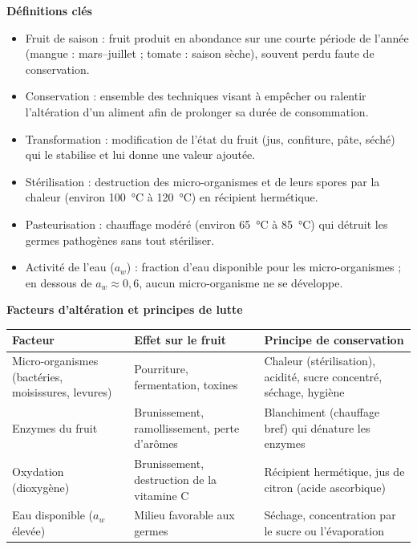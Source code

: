 \documentclass[11pt]{article}
\newcommand{\cle}[1]{{\popxbold\color{popdark}#1}}
\begin{document}
\begin{bilan}
\textbf{Définitions clés}
\begin{itemize}
  \item \cle{Fruit de saison} : fruit produit en abondance sur une courte période de l'année (mangue : mars--juillet ; tomate : saison sèche), souvent perdu faute de conservation.
  \item \cle{Conservation} : ensemble des techniques visant à empêcher ou ralentir l'altération d'un aliment afin de prolonger sa durée de consommation.
  \item \cle{Transformation} : modification de l'état du fruit (jus, confiture, pâte, séché) qui le stabilise et lui donne une valeur ajoutée.
  \item \cle{Stérilisation} : destruction des micro-organismes et de leurs spores par la chaleur (environ \SI{100}{\celsius} à \SI{120}{\celsius}) en récipient hermétique.
  \item \cle{Pasteurisation} : chauffage modéré (environ \SI{65}{\celsius} à \SI{85}{\celsius}) qui détruit les germes pathogènes sans tout stériliser.
  \item \cle{Activité de l'eau} ($a_w$) : fraction d'eau disponible pour les micro-organismes ; en dessous de $a_w \approx 0{,}6$, aucun micro-organisme ne se développe.
\end{itemize}

\textbf{Facteurs d'altération et principes de lutte}
\begin{center}
\begin{tabularx}{\linewidth}{|l|X|X|}
\hline
\rowcolor{popblueL} \textbf{Facteur} & \textbf{Effet sur le fruit} & \textbf{Principe de conservation} \\
\hline
Micro-organismes (bactéries, moisissures, levures) & Pourriture, fermentation, toxines & Chaleur (stérilisation), acidité, sucre concentré, séchage, hygiène \\
\hline
Enzymes du fruit & Brunissement, ramollissement, perte d'arômes & Blanchiment (chauffage bref) qui dénature les enzymes \\
\hline
Oxydation (dioxygène) & Brunissement, destruction de la vitamine C & Récipient hermétique, jus de citron (acide ascorbique) \\
\hline
Eau disponible ($a_w$ élevée) & Milieu favorable aux germes & Séchage, concentration par le sucre ou l'évaporation \\
\hline
\end{tabularx}
\end{center}


\end{bilan}
\end{document}
